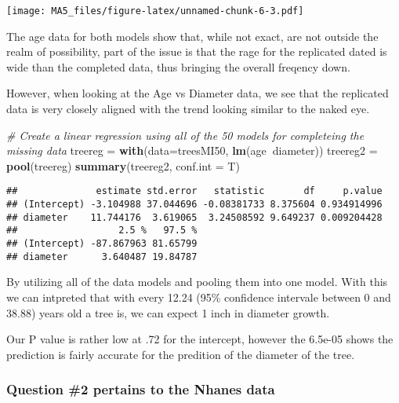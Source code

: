 \documentclass[]{article}
\newenvironment{Shaded}{\begin{snugshade}}{\end{snugshade}}
\newcommand{\KeywordTok}[1]{\textcolor[rgb]{0.13,0.29,0.53}{\textbf{#1}}}
\newcommand{\DataTypeTok}[1]{\textcolor[rgb]{0.13,0.29,0.53}{#1}}
\newcommand{\StringTok}[1]{\textcolor[rgb]{0.31,0.60,0.02}{#1}}
\newcommand{\CommentTok}[1]{\textcolor[rgb]{0.56,0.35,0.01}{\textit{#1}}}
\newcommand{\OperatorTok}[1]{\textcolor[rgb]{0.81,0.36,0.00}{\textbf{#1}}}
\newcommand{\NormalTok}[1]{#1}
\begin{document}
\texttt{[image: MA5\_files/figure-latex/unnamed-chunk-6-3.pdf]}

The age data for both models show that, while not exact, are not outside
the realm of possibility, part of the issue is that the rage for the
replicated dated is wide than the completed data, thus bringing the
overall freqency down.

However, when looking at the Age vs Diameter data, we see that the
replicated data is very closely aligned with the trend looking similar
to the naked eye.

\begin{Shaded}
\begin{Highlighting}[]
\CommentTok{# Create a linear regression using all of the 50 models for completeing the missing data}
\NormalTok{treereg =}\StringTok{ }\KeywordTok{with}\NormalTok{(}\DataTypeTok{data=}\NormalTok{treesMI50, }\KeywordTok{lm}\NormalTok{(age}\OperatorTok{~}\NormalTok{diameter))}
\NormalTok{treereg2 =}\StringTok{ }\KeywordTok{pool}\NormalTok{(treereg)}
\KeywordTok{summary}\NormalTok{(treereg2, }\DataTypeTok{conf.int =}\NormalTok{ T)}
\end{Highlighting}
\end{Shaded}

\begin{verbatim}
##              estimate std.error   statistic       df     p.value
## (Intercept) -3.104988 37.044696 -0.08381733 8.375604 0.934914996
## diameter    11.744176  3.619065  3.24508592 9.649237 0.009204428
##                  2.5 %   97.5 %
## (Intercept) -87.867963 81.65799
## diameter      3.640487 19.84787
\end{verbatim}

By utilizing all of the data models and pooling them into one model.
With this we can intpreted that with every 12.24 (95\% confidence
intervale between 0 and 38.88) years old a tree is, we can expect 1 inch
in diameter growth.

Our P value is rather low at .72 for the intercept, however the 6.5e-05
shows the prediction is fairly accurate for the predition of the
diameter of the tree.

\subsubsection{Question \#2 pertains to the Nhanes
data}\label{question-2-pertains-to-the-nhanes-data}
\end{document}
